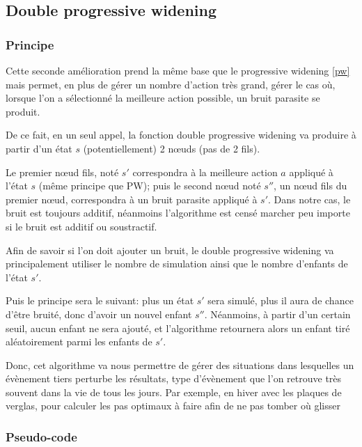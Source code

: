 \documentclass[pdftex,french, english]{article}	%
\begin{document}
	\subsection{Double progressive widening} \label{dpw}
		\subsubsection{Principe} \label{dpw:principe}

			Cette seconde amélioration prend la même base que le progressive widening \ref{pw} mais permet, en plus de gérer un nombre d'action très grand, gérer le cas où, lorsque l'on a sélectionné la meilleure action possible, un bruit parasite se produit.

			De ce fait, en un seul appel, la fonction double progressive widening va produire à partir d'un état $s$ (potentiellement) 2 nœuds (pas de 2 fils).

			Le premier nœud fils, noté $s'$ correspondra à la meilleure action $a$ appliqué à l'état $s$ (même principe que PW); puis le second nœud noté $s''$, un nœud fils du premier nœud, correspondra à un bruit parasite appliqué à $s'$.
			Dans notre cas, le bruit est toujours additif, néanmoins l'algorithme est censé marcher peu importe si le bruit est additif ou soustractif.

			Afin de savoir si l'on doit ajouter un bruit, le double progressive widening va principalement utiliser le nombre de simulation ainsi que le nombre d'enfants de l'état $s'$.

			Puis le principe sera le suivant: plus un état $s'$ sera simulé, plus il aura de chance d'être bruité, donc d'avoir un nouvel enfant $s''$. Néanmoins, à partir d'un certain seuil, aucun enfant ne sera ajouté, et l'algorithme retournera alors un enfant tiré aléatoirement parmi les enfants de $s'$.

			Donc, cet algorithme va nous permettre de gérer des situations dans lesquelles un évènement tiers perturbe les résultats, type d'évènement que l'on retrouve très souvent dans la vie de tous les jours. Par exemple, en hiver avec les plaques de verglas, pour calculer les pas optimaux à faire afin de ne pas tomber où glisser 

		\subsubsection{Pseudo-code} \label{dpw:code}
\end{document}
